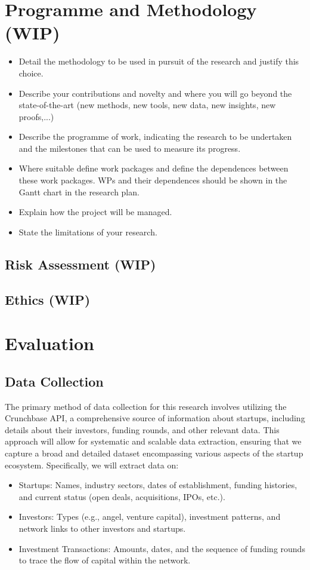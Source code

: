 \documentclass[a4paper,11pt]{article}
\begin{document}
\section{Programme and Methodology (WIP)}

\begin{itemize}
    \item Detail the methodology to be used in pursuit of the research and justify this choice.
    \item Describe your contributions and novelty and where you
    will go beyond the state-of-the-art (new methods, new tools,
    new data, new insights, new proofs,...)
    \item Describe the programme of work, indicating the research to be undertaken and the milestones that can be used to measure its progress.
    \item Where suitable define work packages and define the dependences
    between these work packages. WPs and their dependences should be
    shown in the Gantt chart in the research plan.
    \item Explain how the project will be managed.
    \item State the limitations of your research.
\end{itemize}

\subsection{Risk Assessment (WIP)}

\subsection{Ethics (WIP)}


\section{Evaluation}
\subsection{Data Collection}
The primary method of data collection for this research involves utilizing the Crunchbase API, a comprehensive source of information about startups, including details about their investors, funding rounds, and other relevant data. This approach will allow for systematic and scalable data extraction, ensuring that we capture a broad and detailed dataset encompassing various aspects of the startup ecosystem. Specifically, we will extract data on:
\begin{itemize}
    \item Startups: Names, industry sectors, dates of establishment, funding histories, and current status (open deals, acquisitions, IPOs, etc.).
    \item Investors: Types (e.g., angel, venture capital), investment patterns, and network links to other investors and startups.
    \item Investment Transactions: Amounts, dates, and the sequence of funding rounds to trace the flow of capital within the network.
\end{itemize}
\end{document}

